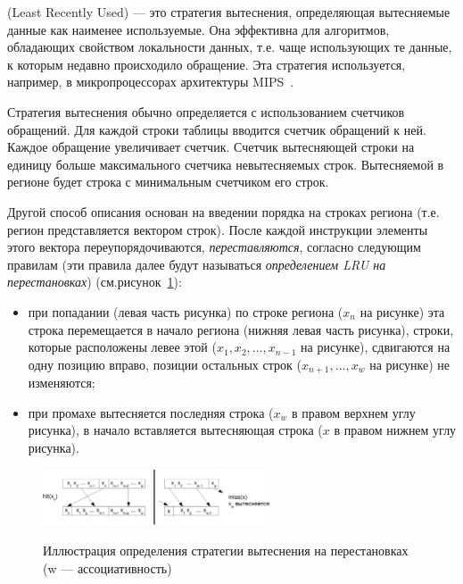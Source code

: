 \LRU (Least Recently Used) --- это стратегия вытеснения,
определяющая вытесняемые данные как наименее используемые. Она
эффективна для алгоритмов, обладающих свойством локальности данных,
т.е. чаще использующих те данные, к которым недавно происходило
обращение. Эта стратегия используется, например, в микропроцессорах
архитектуры MIPS~\cite{mips64II}.

Стратегия вытеснения \LRU обычно определяется с использованием
счетчиков обращений. Для каждой строки таблицы
вводится счетчик обращений к ней. Каждое обращение увеличивает
счетчик. Счетчик вытесняющей строки на единицу больше максимального счетчика невытесняемых строк. Вытесняемой в регионе будет строка с минимальным счетчиком его строк.

Другой способ описания \LRU основан на введении порядка на строках региона (т.е.
регион представляется вектором строк). После каждой инструкции элементы этого вектора переупорядочиваются, \emph{переставляются}, согласно следующим правилам (эти правила далее будут называться \emph{определением LRU на перестановках}) (см.рисунок~\ref{fig:lru1}):
\begin{itemize}
  \item при попадании (левая часть рисунка) по строке региона ($x_n$ на рисунке) эта строка перемещается в начало региона (нижняя левая часть рисунка), строки, которые расположены левее этой ($x_1, x_2, ..., x_{n-1}$ на рисунке), сдвигаются на одну позицию вправо, позиции остальных строк ($x_{n+1}, ..., x_w$ на рисунке) не изменяются;
  \item при промахе вытесняется последняя строка ($x_w$ в правом верхнем углу рисунка), в начало вставляется вытесняющая строка ($x$ в правом нижнем углу рисунка).
\end{itemize}

\begin{figure}[h] \center
  \includegraphics[width=0.6\textwidth]{2.theor/lru1}\\
  \caption{Иллюстрация определения стратегии вытеснения \LRU на перестановках (w --- ассоциативность)}\label{fig:lru1}
\end{figure}

